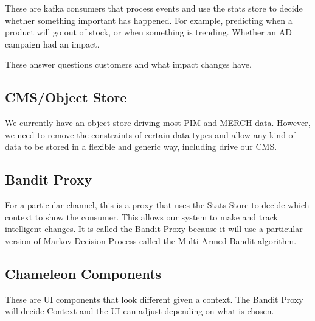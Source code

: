 \documentclass[11pt]{article}
\begin{document}
These are kafka consumers that process events and use the stats store to decide
whether something important has happened. For example, predicting when a product
will go out of stock, or when something is trending. Whether an AD campaign had
an impact.

These answer questions customers and what impact changes have.

\subsection{CMS/Object Store}

We currently have an object store driving most PIM and MERCH data. However, we
need to remove the constraints of certain data types and allow any kind of data to be stored in a
flexible and generic way, including drive our CMS.

\subsection{Bandit Proxy}

For a particular channel, this is a proxy that uses the Stats Store to decide
which context to show the consumer. This allows our system to make and track intelligent
changes. It is called the Bandit Proxy because it will use a particular version
of Markov Decision Process called the Multi Armed Bandit algorithm.

\subsection{Chameleon Components}

These are UI components that look different given a context. The Bandit Proxy 
will decide Context and the UI can adjust depending on what is chosen. 
\end{document}
